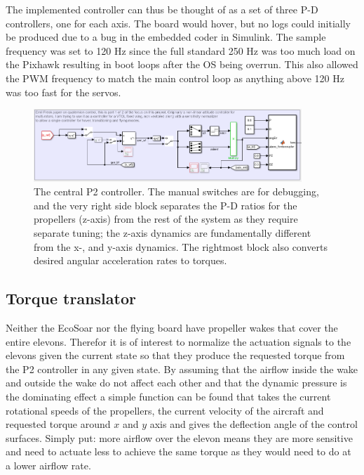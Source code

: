 \documentclass{article}
\begin{document}
The implemented controller can thus be thought of as a set of three P-D controllers, one for each axis.
The board would hover, but no logs could initially be produced due to a bug in the embedded coder in Simulink.
The sample frequency was set to 120 Hz since the full standard 250 Hz was too much load on the Pixhawk resulting in boot loops after the OS being overrun.
This also allowed the PWM frequency to match the main control loop as anything above 120 Hz was too fast for the servos.

\begin{figure}
    \center
    \includegraphics[width=0.9\textwidth]{P2.PNG}
    \caption{The central P2 controller. The manual switches are for debugging, and the very right side block separates the P-D ratios for the propellers (z-axis) from the rest of the system as they require separate tuning; the z-axis dynamics are fundamentally different from the x-, and y-axis dynamics. The rightmost block also converts desired angular acceleration rates to torques.}
    \label{fig:P2_simulink}
\end{figure}

\subsection{Torque translator}
Neither the EcoSoar nor the flying board have propeller wakes that cover the entire elevons.
Therefor it is of interest to normalize the actuation signals to the elevons given the current state so that they produce the requested torque from the P2 controller in any given state.
By assuming that the airflow inside the wake and outside the wake do not affect each other and that the dynamic pressure is the dominating effect a simple function can be found that takes the current rotational speeds of the propellers, the current velocity of the aircraft and requested torque around $x$ and $y$ axis and gives the deflection angle of the control surfaces.
Simply put: more airflow over the elevon means they are more sensitive and need to actuate less to achieve the same torque as they would need to do at a lower airflow rate.
\end{document}
